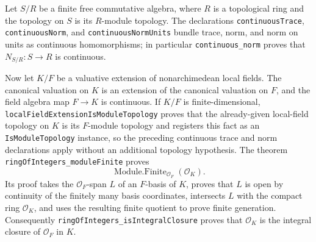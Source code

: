 \begin{definition}
Let $S/R$ be a finite free commutative algebra, where $R$ is a topological
ring and the topology on $S$ is its $R$-module topology.  The declarations
\texttt{continuousTrace}, \texttt{continuousNorm}, and
\texttt{continuousNormUnits} bundle trace, norm, and norm on units as
continuous homomorphisms; in particular \texttt{continuous\_norm} proves
that $N_{S/R}:S\to R$ is continuous.

Now let $K/F$ be a valuative extension of nonarchimedean local fields.
The canonical valuation on $K$ is an extension of the canonical valuation
on $F$, and the field algebra map $F\to K$ is continuous.  If $K/F$ is
finite-dimensional, \texttt{localFieldExtensionIsModuleTopology} proves that
the already-given local-field topology on $K$ is its $F$-module topology and
registers this fact as an \texttt{IsModuleTopology} instance, so the preceding
continuous trace and norm declarations apply without an additional topology
hypothesis.
The theorem \texttt{ringOfIntegers\_moduleFinite} proves
\[
 \operatorname{Module.Finite}_{\mathcal O_F}(\mathcal O_K).
\]
Its proof takes the $\mathcal O_F$-span $L$ of an $F$-basis of $K$, proves
that $L$ is open by continuity of the finitely many basis coordinates,
intersects $L$ with the compact ring $\mathcal O_K$, and uses the resulting
finite quotient to prove finite generation.  Consequently
\texttt{ringOfIntegers\_isIntegralClosure} proves that $\mathcal O_K$ is
the integral closure of $\mathcal O_F$ in $K$.


\end{definition}
